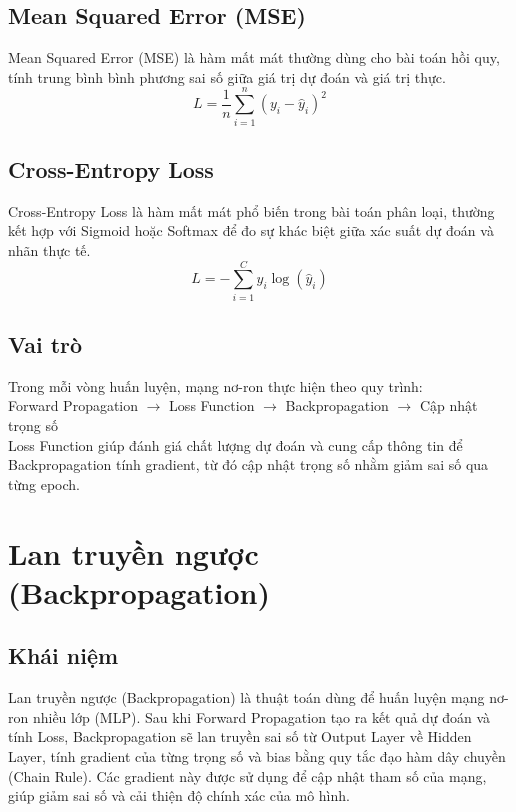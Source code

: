 \documentclass[12pt,a4paper]{report}
\begin{document}
\subsection{Mean Squared Error (MSE)}
Mean Squared Error (MSE) là hàm mất mát thường dùng cho bài toán hồi quy, tính trung bình bình phương sai số giữa giá trị dự đoán và giá trị thực.
\begin{equation}
    L = \frac{1}{n} \sum_{i=1}^n (y_i - \hat{y}_i)^2
\end{equation}

\subsection{Cross-Entropy Loss}
Cross-Entropy Loss là hàm mất mát phổ biến trong bài toán phân loại, thường kết hợp với Sigmoid hoặc Softmax để đo sự khác biệt giữa xác suất dự đoán và nhãn thực tế.
\begin{equation}
    L = - \sum_{i=1}^C y_i \log(\hat{y}_i)
\end{equation}

\subsection{Vai trò}
Trong mỗi vòng huấn luyện, mạng nơ-ron thực hiện theo quy trình: \\
Forward Propagation $\rightarrow$ Loss Function $\rightarrow$ Backpropagation $\rightarrow$ Cập nhật trọng số \\
Loss Function giúp đánh giá chất lượng dự đoán và cung cấp thông tin để Backpropagation tính gradient, từ đó cập nhật trọng số nhằm giảm sai số qua từng epoch.

\section{Lan truyền ngược (Backpropagation)}
\subsection{Khái niệm}
Lan truyền ngược (Backpropagation) là thuật toán dùng để huấn luyện mạng nơ-ron nhiều lớp (MLP). Sau khi Forward Propagation tạo ra kết quả dự đoán và tính Loss, Backpropagation sẽ lan truyền sai số từ Output Layer về Hidden Layer, tính gradient của từng trọng số và bias bằng quy tắc đạo hàm dây chuyền (Chain Rule). Các gradient này được sử dụng để cập nhật tham số của mạng, giúp giảm sai số và cải thiện độ chính xác của mô hình.
\end{document}
